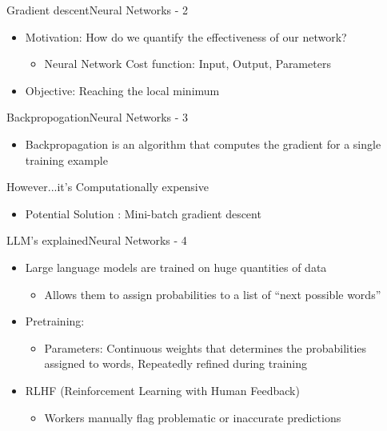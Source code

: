 \documentclass{beamer}
\begin{document}
		\begin{frame}{Gradient descent}{Neural Networks - 2}
			\begin{itemize}
				\item Motivation: How do we quantify the effectiveness of our network?
				\begin{itemize}
					\item Neural Network Cost function: Input, Output, Parameters
				\end{itemize}
				\item Objective: Reaching the local minimum
			\end{itemize}
		\end{frame}

		\begin{frame}{Backpropogation}{Neural Networks - 3}
			\begin{itemize}
				\item Backpropagation is an algorithm that computes the gradient for a single training example
			\end{itemize}
			However...it's Computationally expensive
			\begin{itemize}
				\item Potential Solution :  Mini-batch gradient descent
			\end{itemize}
		\end{frame}

		\begin{frame}{LLM’s explained}{Neural Networks - 4}
			\begin{itemize}
				\item Large language models are trained on huge quantities of data
				\begin{itemize}
					\item Allows them to assign probabilities to a list of “next possible words”
				\end{itemize}
				\item Pretraining:
				\begin{itemize}
					\item Parameters: Continuous weights that determines the probabilities assigned to words, Repeatedly refined during training
				\end{itemize}
			\item RLHF (Reinforcement Learning with Human Feedback)
				\begin{itemize}
					\item Workers manually flag problematic or inaccurate predictions
				\end{itemize}
			\end{itemize}
		\end{frame}
\end{document}
